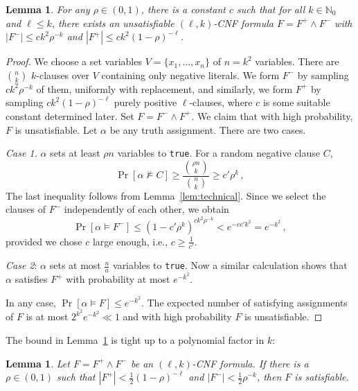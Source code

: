 \documentclass[a4paper, 11pt]{article}
\newtheorem{lemma}[theorem]{Lemma}
\begin{document}
\begin{lemma}\label{lem:t}
  For any $\rho \in (0,1)$, there is a constant $c$ such that for all
  $k\in\mathbb{N}_0$ and $\ell \leq k$, there exists an unsatisfiable
  $(\ell, k)$-CNF formula $F = F^+ \wedge F^-$ with $|F^-| \leq ck^2
  \rho^{-k}$ and $|F^+| \leq ck^2 (1-\rho)^{-\ell}$. \\
\end{lemma}

\begin{proof}
  We choose a set variables $V=\{x_1,\dots,x_n\}$ of $n=k^2$
  variables.  There are $\binom{n}{k}$ $k$-clauses over $V$ containing
  only negative literals. We form $F^-$ by sampling $ck^2 \rho^{-k}$
  of them, uniformly with replacement, and similarly, we form $F^+$ by
  sampling $ck^2 (1-\rho)^{-\ell}$ purely positive $\ell$-clauses,
  where $c$ is some suitable constant determined later. Set $F=F^-
  \wedge F^+$.  We claim that with high probability, $F$ is
  unsatisfiable.  Let $\alpha$ be any truth assignment. There are two
  cases.
  
  \emph{Case 1.} $\alpha$ sets at least $\rho n$ variables to
  \texttt{true}.  For a random negative clause $C$,
  \[
  \Pr[\alpha \not \models C] \geq 
  \frac{\binom{\rho n}{k}}{\binom{n}{k}} \geq c' \rho^k\,,
  \]
  The last inequality follows from Lemma~\ref{lem:technical}. Since we
  select the clauses of $F^-$ independently of each other, we obtain
  \[
  \Pr[\alpha \models F^-] \leq (1 - c'\rho^k)^{ck^2 \rho^{-k}} <
  e^{-c c' k^2}=e^{-k^2}\, ,
  \]
  provided we chose $c$ large enough, i.e., $c \geq \frac{1}{c'}$.
  
  {\em Case 2}: $\alpha$ sets at most $\frac{n}{a}$ variables to
  \texttt{true}. Now a similar calculation shows that $\alpha$
  satisfies $F^+$ with probability at most $e^{-k^2}$.

  In any case, $\Pr[\alpha \models F] \leq e^{-k^2}$. The expected
  number of satisfying assignments of $F$ is at most $2^{k^2}e^{-k^2}
  \ll 1$ and with high probability $F$ is unsatisfiable.
\end{proof}

The bound in Lemma~\ref{lem:t} is tight up to a polynomial factor in
$k$:

\begin{lemma}
 Let $F=F^+ \wedge F^-$ be an $(\ell,k)$-CNF formula.
  If there is a $\rho \in (0,1)$ such that $|F^+| <
  \frac{1}{2}(1-\rho)^{-\ell}$ and $|F^-| < \frac{1}{2}\rho^{-k}$,
  then $F$ is satisfiable.
\end{lemma}
\end{document}
